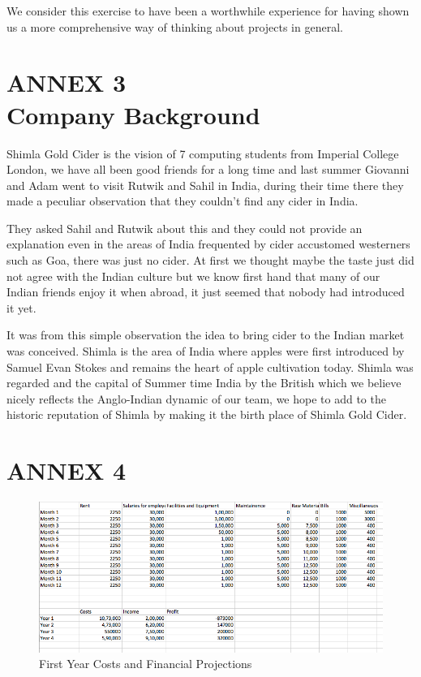 \documentclass[11pt]{article}
\begin{document}
We consider this exercise to have been a worthwhile experience for having shown
us a more comprehensive way of thinking about projects in general.

\newpage


\section{ANNEX 3 \\ Company Background}
Shimla Gold Cider is the vision of 7 computing students from Imperial College
London, we have all been good friends for a long time and last summer Giovanni and
Adam went to visit Rutwik and Sahil in India, during their time there they made
a peculiar observation that they couldn't find any cider in India.

They asked Sahil and Rutwik about this and they could not provide an explanation
even in the areas of India frequented by cider accustomed westerners such as
Goa, there was just no cider. At first we thought maybe the taste just did not 
agree with the Indian culture but we know first hand that many of our Indian 
friends enjoy it when abroad, it just seemed that nobody had introduced it yet.

It was from this simple observation the idea to bring cider to the Indian market
was conceived. Shimla is the area of India where apples were first introduced by
Samuel Evan Stokes and remains the heart of apple cultivation today. Shimla was
regarded and the capital of Summer time India by the British which we believe 
nicely reflects the Anglo-Indian dynamic of our team, we hope to add to the 
historic reputation of Shimla by making it the birth place of Shimla Gold Cider.

\newpage


\section{ANNEX 4}

\begin{figure}[H]
	\centering
	\caption{First Year Costs and Financial Projections}
	\includegraphics[width=\textwidth]{costs.png}
\end{figure}

\end{document}
